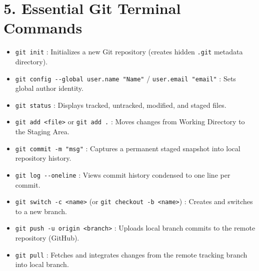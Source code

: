 \section*{5. Essential Git Terminal Commands}
\begin{itemize}[leftmargin=6mm]
    \item \texttt{git init} : Initializes a new Git repository (creates hidden \texttt{.git} metadata directory).
    \item \texttt{git config -{}-global user.name "Name"} / \texttt{user.email "email"} : Sets global author identity.
    \item \texttt{git status} : Displays tracked, untracked, modified, and staged files.
    \item \texttt{git add <file>} or \texttt{git add .} : Moves changes from Working Directory to the Staging Area.
    \item \texttt{git commit -m "msg"} : Captures a permanent staged snapshot into local repository history.
    \item \texttt{git log -{}-oneline} : Views commit history condensed to one line per commit.
    \item \texttt{git switch -c <name>} (or \texttt{git checkout -b <name>}) : Creates and switches to a new branch.
    \item \texttt{git push -u origin <branch>} : Uploads local branch commits to the remote repository (GitHub).
    \item \texttt{git pull} : Fetches and integrates changes from the remote tracking branch into local branch.
\end{itemize}

\newpage
